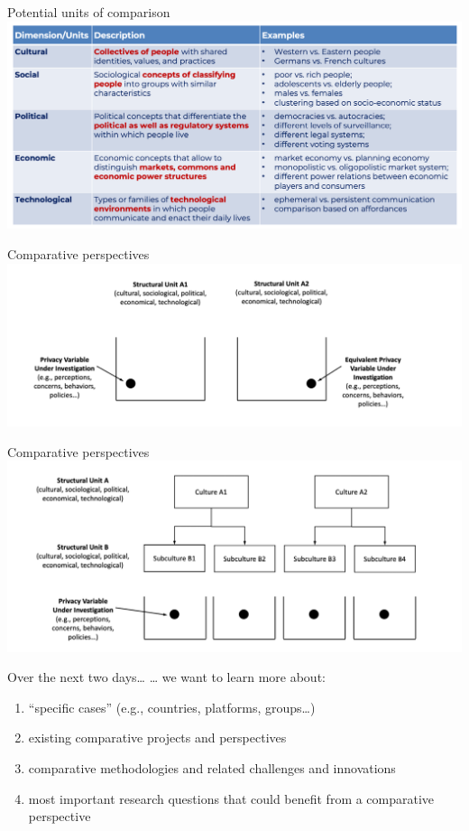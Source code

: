 \documentclass[
  ignorenonframetext,
]{beamer}
\begin{document}
\begin{frame}{Potential units of comparison}
\protect\hypertarget{potential-units-of-comparison}{}
\includegraphics{img/units.png}
\end{frame}

\begin{frame}{Comparative perspectives}
\protect\hypertarget{comparative-perspectives}{}
\includegraphics{img/entanglement.png}
\end{frame}

\begin{frame}{Comparative perspectives}
\protect\hypertarget{comparative-perspectives-1}{}
\includegraphics{img/entanglement2.png}
\end{frame}

\begin{frame}{Over the next two days\ldots{}}
\protect\hypertarget{over-the-next-two-days}{}
\ldots{} we want to learn more about:

\begin{enumerate}
\item
  ``specific cases'' (e.g., countries, platforms, groups\ldots)
\item
  existing comparative projects and perspectives
\item
  comparative methodologies and related challenges and innovations
\item
  most important research questions that could benefit from a
  comparative perspective
\end{enumerate}
\end{frame}
\end{document}

